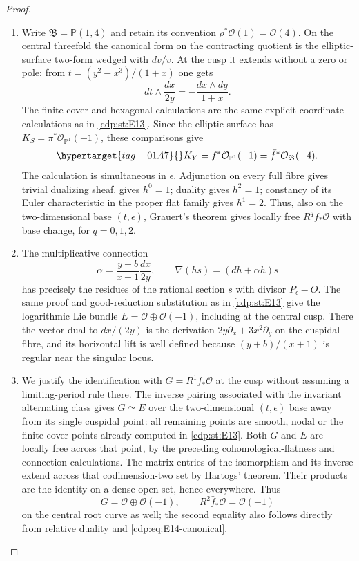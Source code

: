 \begin{proof}
\begin{enumerate}[label={$\langle1\rangle$\arabic*.},leftmargin=*]
\item Write $\mathfrak B=\mathbb P(1,4)$ and retain its convention
$\rho^*\mathcal O(1)=\mathcal O(4)$. On the central threefold the
canonical form on the contracting quotient is the elliptic-surface
two-form wedged with $dv/v$. At the cusp it extends without a zero
or pole: from $t=(y^2-x^3)/(1+x)$ one gets
\[
 dt\wedge\frac{dx}{2y}=-\frac{dx\wedge dy}{1+x}.
\]
The finite-cover and hexagonal calculations are the same explicit
coordinate calculations as in \ref{cdp:st:E13}. Since the elliptic surface has
$K_S=\pi^*\mathcal O_{\mathbb P^1}(-1)$, these comparisons give
\begin{equation}\hypertarget{tag-01A7}{}\label{cdp:eq:E14-canonical}
 K_Y=f^*\mathcal O_{\mathbb P^1}(-1)
     =\bar f^*\mathcal O_{\mathfrak B}(-4).
\end{equation}
The calculation is simultaneous in $\epsilon$. Adjunction on every
full fibre gives trivial dualizing sheaf. \cite[Theorem~2.2, pp.~4--5]{Viaclovsky2026Combs} gives $h^0=1$;
duality gives $h^2=1$; constancy of its Euler characteristic in the
proper flat family gives $h^1=2$. Thus, also on the two-dimensional
base $(t,\epsilon)$, Grauert's theorem gives locally free $R^qf_*\mathcal O$
with base change, for $q=0,1,2$.

\item The multiplicative connection
\[
 \alpha=\frac{y+b}{x+1}\frac{dx}{2y},\qquad
 \nabla(hs)=(dh+\alpha h)s
\]
has precisely the residues of the rational section $s$ with divisor
$P_\epsilon-O$. The same proof and good-reduction substitution as
in \ref{cdp:st:E13} give the logarithmic Lie bundle
$E=\mathcal O\oplus\mathcal O(-1)$, including at the central
cusp. There the vector dual to $dx/(2y)$ is the derivation
$2y\partial_x+3x^2\partial_y$ on the cuspidal fibre, and its
horizontal lift is well defined because
$(y+b)/(x+1)$ is regular near the singular locus.

\item We justify the identification with $G=R^1\bar f_*\mathcal O$
at the cusp without assuming a limiting-period rule there.
The inverse pairing associated with the invariant alternating
class gives $G\simeq E$ over the two-dimensional $(t,\epsilon)$
base away from its single cuspidal point: all remaining points
are smooth, nodal or the finite-cover points already computed in
\ref{cdp:st:E13}. Both $G$ and $E$ are locally free across that point, by the
preceding cohomological-flatness and connection calculations.
The matrix entries of the isomorphism and its inverse extend
across that codimension-two set by Hartogs' theorem. Their products
are the identity on a dense open set, hence everywhere. Thus
\[
 G=\mathcal O\oplus\mathcal O(-1),\qquad
 R^2\bar f_*\mathcal O=\mathcal O(-1)
\]
on the central root curve as well; the second equality also follows
directly from relative duality and \eqref{cdp:eq:E14-canonical}.


\end{enumerate}
\end{proof}
